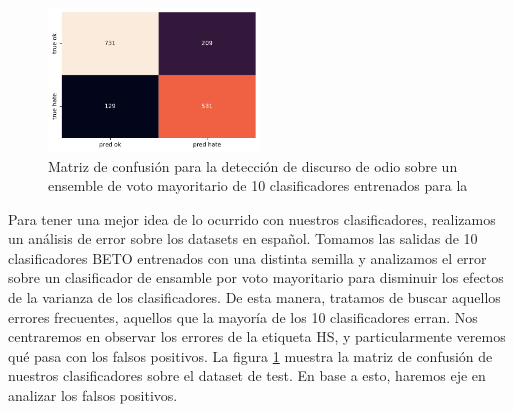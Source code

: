 
\begin{figure}[t]
    \centering
    \includegraphics[width=0.5\textwidth]{img/hateval_confusion_matrix.pdf}
    \caption{Matriz de confusión para la detección de discurso de odio sobre un ensemble de voto mayoritario de 10 clasificadores entrenados para la \subtaskb{}}
    \label{fig:hateval_error_analysis}
\end{figure}


Para tener una mejor idea de lo ocurrido con nuestros clasificadores, realizamos un análisis de error sobre los datasets en español. Tomamos las salidas de 10 clasificadores BETO entrenados con una distinta semilla y analizamos el error sobre un clasificador de ensamble por voto mayoritario para disminuir los efectos de la varianza de los clasificadores. De esta manera, tratamos de buscar aquellos errores frecuentes, aquellos que la mayoría de los 10 clasificadores erran. Nos centraremos en observar los errores de la etiqueta HS, y particularmente veremos qué pasa con los falsos positivos. La figura \ref{fig:hateval_error_analysis} muestra la matriz de confusión de nuestros clasificadores sobre el dataset de test. En base a esto, haremos eje en analizar los falsos positivos.


